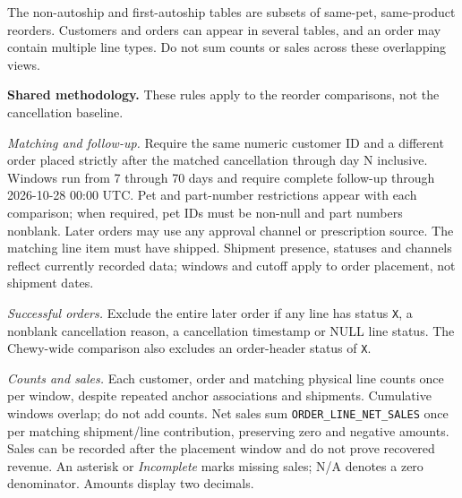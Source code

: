The non-autoship and first-autoship tables are subsets of same-pet,
same-product reorders. Customers and orders can appear in several tables,
and an order may contain multiple line types. Do not sum counts or sales
across these overlapping views.

\par\medskip
\noindent\textbf{Shared methodology.}
These rules apply to the reorder comparisons, not the cancellation baseline.

\textit{Matching and follow-up.} Require the same numeric customer ID and a
 different order placed strictly after the matched cancellation through day
N inclusive. Windows run from 7 through 70 days and require complete follow-up
through 2026-10-28 00:00 UTC. Pet and part-number restrictions appear with each
comparison; when required, pet IDs must be non-null and part numbers nonblank.
Later orders may use any approval channel or prescription source.
The matching line item must have shipped.
Shipment presence, statuses and channels reflect currently recorded data;
windows and cutoff apply to order placement, not shipment dates.

\textit{Successful orders.} Exclude the entire later order if any line has status \texttt{X}, a nonblank
cancellation reason, a cancellation timestamp or NULL line status. The
Chewy-wide comparison also excludes an order-header status of \texttt{X}.

\textit{Counts and sales.} Each customer, order and matching physical line
counts once per window, despite repeated anchor associations and shipments.
Cumulative windows overlap; do not add counts. Net sales sum
\texttt{ORDER\_LINE\_NET\_SALES} once per matching shipment/line contribution,
preserving zero and negative amounts. Sales can be recorded after the
placement window and do not prove recovered revenue. An asterisk or
\textit{Incomplete} marks missing sales; N/A denotes a zero denominator.
Amounts display two decimals.









